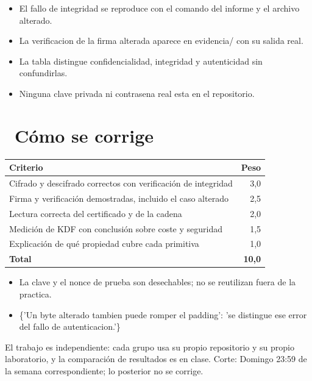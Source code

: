 \documentclass[11pt,a4paper]{article}
\newcommand{\iconotexto}[2]{\textcolor{cyanNeon}{\faIcon{#1}}~#2}
\begin{document}
\begin{itemize}[leftmargin=1.4em,itemsep=2pt,topsep=3pt]
  \item El fallo de integridad se reproduce con el comando del informe y el archivo alterado.
  \item La verificacion de la firma alterada aparece en evidencia/ con su salida real.
  \item La tabla distingue confidencialidad, integridad y autenticidad sin confundirlas.
  \item Ninguna clave privada ni contrasena real esta en el repositorio.
\end{itemize}

\section{\iconotexto{ruler-combined}{Cómo se corrige}}

\begin{tabularx}{\linewidth}{@{}X r@{}}
\toprule
Criterio & Peso\\
\midrule
Cifrado y descifrado correctos con verificación de integridad & 3,0 \\
Firma y verificación demostradas, incluido el caso alterado & 2,5 \\
Lectura correcta del certificado y de la cadena & 2,0 \\
Medición de KDF con conclusión sobre coste y seguridad & 1,5 \\
Explicación de qué propiedad cubre cada primitiva & 1,0 \\
\midrule
\textbf{Total} & \textbf{10,0}\\
\bottomrule
\end{tabularx}

\begin{itemize}[leftmargin=1.4em,itemsep=2pt,topsep=3pt]
  \item La clave y el nonce de prueba son desechables; no se reutilizan fuera de la practica.
  \item \{'Un byte alterado tambien puede romper el padding': 'se distingue ese error del fallo de autenticacion.'\}
\end{itemize}

\begin{cajaRecuerda}El trabajo es independiente: cada grupo usa su propio repositorio y su propio laboratorio, y la comparación de resultados es en clase. Corte: Domingo 23:59 de la semana correspondiente; lo posterior no se corrige.
\end{cajaRecuerda}
\end{document}
